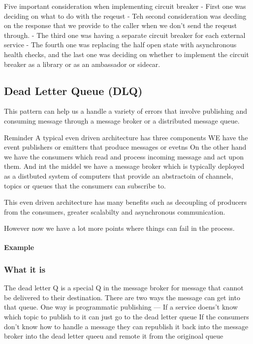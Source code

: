 \documentclass[a4paper, 11pt]{book}
\begin{document}
    Five important consideration when implementing circuit breaker
    - First one was deciding on what to do with the reqeust
    - Teh second consideration was decding on the response that we provide to the caller when we don't send the reqeust through.
    - The third one was having a separate circuit breaker for each external service
    - The fourth one was replacing the half open state with asynchronous health checks, and the last one was deciding on whether to implement the circuit breaker as a library or as an ambassador or sidecar.

    \subsection{Dead Letter Queue (DLQ)}

    This pattern can help us a handle a variety of errors that involve publishing and consuming message through a message broker or a distributed message queue.

    Reminder
    A typical even driven architecture has three components
    WE have the event publishers or emitters that produce messages or evetns
    On the other hand we have the consumers which read and process incoming message and act upon them.
    And int the middel we have a message broker which is typically deployed as a distbuted system of computers that provide an abstractoin of channels, topics or queues that the consumers can subscribe to.

    This even driven architecture has many benefits such as decoupling of producers from the consumers, greater scalabilty and asynchronous communication.

    However now we have a lot more points where things can fail in the process.

    \paragraph{Example}

    \subsubsection{What it is}
    The dead letter Q is a special Q in the message broker for message that cannot be delivered to their destination.
    There are two ways the message can get into that queue.
    One way is programmatic publishing
    --- If a service doens't know which topic to publish to it can just go to the dead letter queue
    If the consumers don't know how to handle a message they can republish it back into the message broker into the dead letter queeu and remote it from the originoal queue
\end{document}
